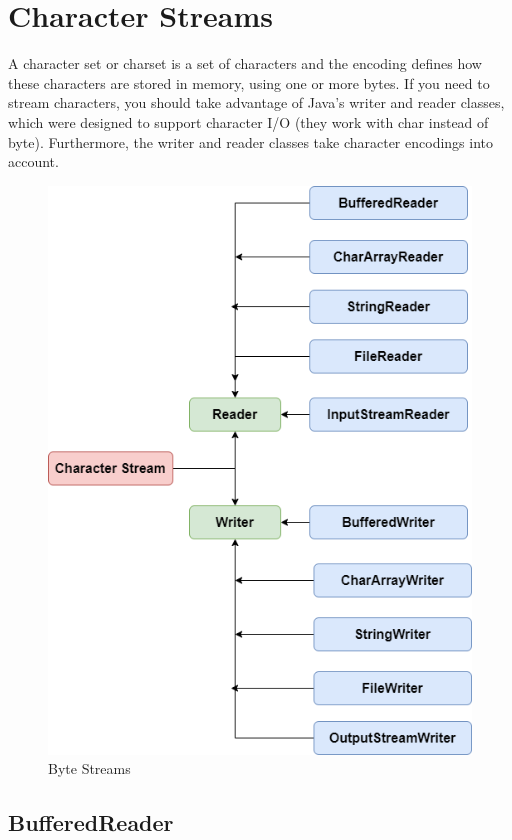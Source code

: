 \section{Character Streams}

A character set or charset is a set of characters and the encoding defines how these characters are stored in memory,  using one or more bytes.
If you need to stream characters, you should take advantage of Java’s writer and reader classes, which were designed to support character I/O (they work with char instead of byte). Furthermore, the writer and reader classes take character encodings into account.


\begin{figure}[H]
  \includegraphics[width=\linewidth]{images/chapter_files/character_stream_classes.png}
  \caption{Byte Streams}
  \label{fig:paths}
\end{figure}


\subsection{BufferedReader}

